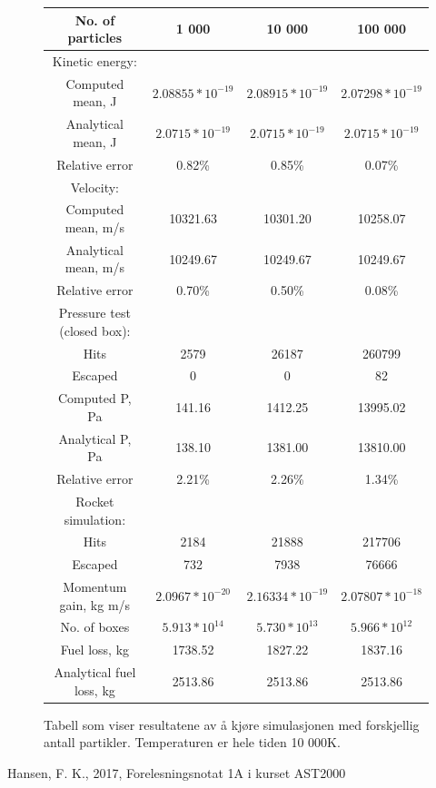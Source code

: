 \documentclass[reprint,english,notitlepage]{revtex4-1}  %
\begin{document}
\begin{figure}[p]
  \begin{tabular}{||c c c c||}
  \hline
  No. of particles & 1 000 & 10 000 & 100 000 \\ [0.5ex]
  \hline\hline
  Kinetic energy: &  &  &  \\
  \hline
  Computed mean, J & $2.08855*10^{-19}$ & $2.08915*10^{-19}$ & $2.07298*10^{-19}$ \\
  \hline
  Analytical mean, J & $2.0715*10^{-19}$ & $2.0715*10^{-19}$ & $2.0715*10^{-19}$ \\
  \hline
  Relative error & 0.82\% & 0.85\% & 0.07\% \\

  \hline\hline
  Velocity: &  &  &  \\
  \hline
  Computed mean, m/s & 10321.63 & 10301.20 & 10258.07 \\
  \hline
  Analytical mean, m/s & 10249.67 & 10249.67 & 10249.67 \\
  \hline
  Relative error & 0.70\% & 0.50\% & 0.08\% \\

  \hline\hline
  Pressure test (closed box):  &  &  &  \\
  \hline
  Hits & 2579 & 26187 & 260799 \\
  \hline
  Escaped & 0 & 0 & 82 \\
  \hline
  Computed P, Pa & 141.16 & 1412.25 & 13995.02 \\
  \hline
  Analytical P, Pa & 138.10 & 1381.00 & 13810.00 \\
  \hline
  Relative error & 2.21\% & 2.26\% & 1.34\% \\

  \hline\hline
  Rocket simulation: &  &  &  \\
  \hline
  Hits & 2184 & 21888 & 217706 \\
  \hline
  Escaped & 732 & 7938 & 76666 \\
  \hline
  Momentum gain, kg m/s & $2.0967*10^{-20}$ & $2.16334*10^{-19}$ & $2.07807*10^{-18}$ \\
  \hline
  No. of boxes & $5.913*10^{14}$ & $5.730*10^{13}$ & $5.966*10^{12}$ \\
  \hline
  Fuel loss, kg & 1738.52 & 1827.22 & 1837.16 \\
  \hline
  Analytical fuel loss, kg & 2513.86 & 2513.86 & 2513.86 \\ [1ex]
  \hline
 \end{tabular}
\caption{Tabell som viser resultatene av å kjøre simulasjonen med forskjellig antall partikler. Temperaturen er hele tiden 10 000K.\label{fig:tabell}}
\end{figure}





\begin{thebibliography}{}
 Hansen, F. K.,  2017, Forelesningsnotat 1A i kurset AST2000


\end{thebibliography}
\end{document}
